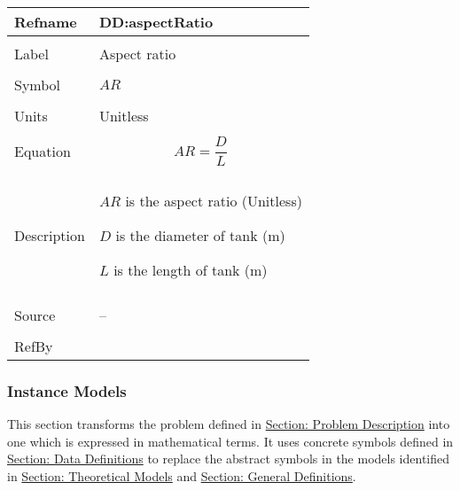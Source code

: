 \documentclass[12pt]{article}
\begin{document}
\vspace{\baselineskip}
\noindent
\begin{minipage}{\textwidth}
\begin{tabular}{>{\raggedright}p{}>{\raggedright\arraybackslash}p{}}
\toprule \textbf{Refname} & \textbf{DD:aspectRatio}
\label{DD:aspectRatio}
\\ \midrule \\
Label & Aspect ratio
        
\\ \midrule \\
Symbol & $AR$
         
\\ \midrule \\
Units & Unitless
        
\\ \midrule \\
Equation & \begin{displaymath}
           AR=\frac{D}{L}
           \end{displaymath}
\\ \midrule \\
Description & \begin{symbDescription}
              \item{$AR$ is the aspect ratio (Unitless)}
              \item{$D$ is the diameter of tank (${\text{m}}$)}
              \item{$L$ is the length of tank (${\text{m}}$)}
              \end{symbDescription}
\\ \midrule \\
Source & --
         
\\ \midrule \\
RefBy & 
\\ \bottomrule
\end{tabular}
\end{minipage}

\subsubsection{Instance Models}
\label{Sec:IMs}
This section transforms the problem defined in \hyperref[Sec:ProbDesc]{Section: Problem Description} into one which is expressed in mathematical terms. It uses concrete symbols defined in \hyperref[Sec:DDs]{Section: Data Definitions} to replace the abstract symbols in the models identified in \hyperref[Sec:TMs]{Section: Theoretical Models} and \hyperref[Sec:GDs]{Section: General Definitions}.
\end{document}
